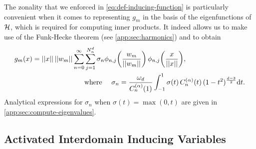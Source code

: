 The zonality that we enforced in \cref{eq:def-inducing-function} is particularly convenient when it comes to representing $g_m$ in the basis of the eigenfunctions of ${\mathcal{H}}$, which is required for computing inner products. It indeed allows us to make use of the Funk-Hecke theorem (see \cref{app:sec:harmonics}) and to obtain
\begin{equation}
\begin{aligned}
\label{eq:fourier-decomposition-activation-functions-new}
    g_m(x) = \norm{x}\, \norm{w_m} \sum_{n=0}^\infty &\sum_{j=1}^{\dnumharmonicsforlevel}  \sigma_n \phi_{n, j}\left(\frac{w_m}{\norm{w_m}}\right)\, \phi_{n, j}\left(\frac{x}{\norm{x}}\right), \\
   & \text{where \quad} \sigma_{n} = 
   \frac{\omega_{d}}{C_n^{(\alpha)}(1)} \int_{-1}^1 \sigma(t)\,C_n^{(\alpha)}(t)\,(1 - t^2)^{\frac{d-3}{2}} \calcd{t}.
\end{aligned}
\end{equation}
Analytical expressions for $\sigma_n$ when $\sigma(t)=\max(0, t)$ are given in \cref{app:sec:compute-eigenvalues}.





\subsection{Activated Interdomain Inducing Variables}
\label{sec:relu-inducing-variables}


